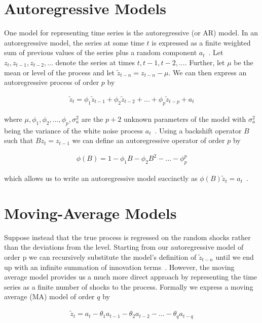 \documentclass[oneside,12pt,openany]{book}
\begin{document}
	\section{Autoregressive Models}

	 One model for representing time series is the autoregressive (or AR) model. In an autoregressive model, the series at some time $t$ is expressed as a finite weighted sum of previous values of the series plus a random component $a_{t}$~\cite{Box}. Let $z_{t}, z_{t-1}, z_{t-2},...$ denote the series at times $t, t-1, t-2,...$. Further, let $\mu$ be the mean or level of the process and let $\tilde{z}_{t-n}=z_{t-n}-\mu$. We can then express an autoregressive process of order $p$ by
	
	\begin{align}
		\label{eqn:armodel}
		\tilde{z}_{t}=\phi_{1} \tilde{z}_{t-1}+\phi_{2} \tilde{z}_{t-2}+...+\phi_{p} \tilde{z}_{t-p}+a_{t}
	\end{align}
	
	\noindent where $\mu, \phi_{1}, \phi_{2}, ..., \phi_{p}, \sigma^{2}_{a}$ are the $p+2$ unknown parameters of the model with $\sigma^{2}_{a}$ being the variance of the white noise process $a_{t}$~\cite{Box}. Using a backshift operator $B$ such that $Bz_{t}=z_{t-1}$ we can define an autoregressive operator of order $p$ by
	
	\begin{align}
		\label{eqn:arop}
		\phi(B)=1-\phi_{1}B-\phi_{2}B^{2}-...-\phi_{p}^{p}
	\end{align}
	
	\noindent which allows us to write an autoregressive model succinctly as $\phi(B)\tilde{z}_{t}=a_{t}$~\cite{Box}.

	\section{Moving-Average Models}
	
	Suppose instead that the true process is regressed on the random shocks rather than the deviations from the level. Starting from our autoregressive model  of order p we can recursively substitute the model's definition of $\tilde{z}_{t-n}$ until we end up with an infinite summation of innovation terms~\cite{Box}. However, the moving average model provides us a much more direct approach by representing the time series as a finite number of shocks to the process. Formally we express a moving average (MA) model of order $q$ by
	
	\begin{align}
		\label{eqn:mamodel}
		\tilde{z}_{t}=a_{t}-\theta_{1}a_{t-1}-\theta_{2}a_{t-2}-...-\theta_{q}a_{t-q}
	\end{align}
	
\end{document}
